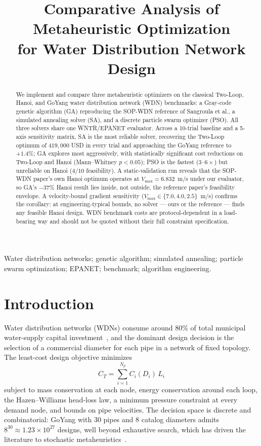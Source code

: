 \documentclass[conference]{IEEEtran}
\title{Comparative Analysis of Metaheuristic Optimization\\
for Water Distribution Network Design}
\author{
\IEEEauthorblockN{Mihai Cotin, Andrei Karp}
\IEEEauthorblockA{Experimental Analysis of Algorithms (Algorithm Engineering)\\
Project Phase 2, May 2026}
}
\begin{document}
\maketitle

\begin{abstract}
We implement and compare three metaheuristic optimizers on the classical Two-Loop, Hanoi, and GoYang water distribution network (WDN) benchmarks: a Gray-code genetic algorithm (GA) reproducing the SOP-WDN reference of Sangroula et al., a simulated annealing solver (SA), and a discrete particle swarm optimizer (PSO). All three solvers share one WNTR/EPANET evaluator. Across a 10-trial baseline and a 5-axis sensitivity matrix, SA is the most reliable solver, recovering the Two-Loop optimum of $419{,}000$ USD in every trial and approaching the GoYang reference to $+1.4\%$; GA explores most aggressively, with statistically significant cost reductions on Two-Loop and Hanoi (Mann--Whitney $p<0.05$); PSO is the fastest ($3$--$6\times$) but unreliable on Hanoi ($4/10$ feasibility). A static-validation run reveals that the SOP-WDN paper's own Hanoi optimum operates at $V_{\max}=6.832$~m/s under our evaluator, so GA's $-37\%$ Hanoi result lies inside, not outside, the reference paper's feasibility envelope. A velocity-bound gradient sensitivity ($V_{\max}\in\{7.0, 4.0, 2.5\}$~m/s) confirms the corollary: at engineering-typical bounds, no solver --- ours or the reference --- finds any feasible Hanoi design. WDN benchmark costs are protocol-dependent in a load-bearing way and should not be quoted without their full constraint specification.
\end{abstract}

\begin{IEEEkeywords}
Water distribution networks; genetic algorithm; simulated annealing; particle swarm optimization; EPANET; benchmark; algorithm engineering.
\end{IEEEkeywords}

\section{Introduction}
Water distribution networks (WDNs) consume around 80\% of total municipal water-supply capital investment~\cite{sangroula2022}, and the dominant design decision is the selection of a commercial diameter for each pipe in a network of fixed topology. The least-cost design objective minimizes
\begin{equation}
C_T = \sum_{i=1}^{N_p} C_i(D_i)\,L_i
\label{eq:cost}
\end{equation}
subject to mass conservation at each node, energy conservation around each loop, the Hazen--Williams head-loss law, a minimum pressure constraint at every demand node, and bounds on pipe velocities. The decision space is discrete and combinatorial: GoYang with 30 pipes and 8 catalog diameters admits $8^{30}\approx1.23\times10^{27}$ designs, well beyond exhaustive search, which has driven the literature to stochastic metaheuristics~\cite{alperovits1977,kim1994,savic1997}.
\end{document}
